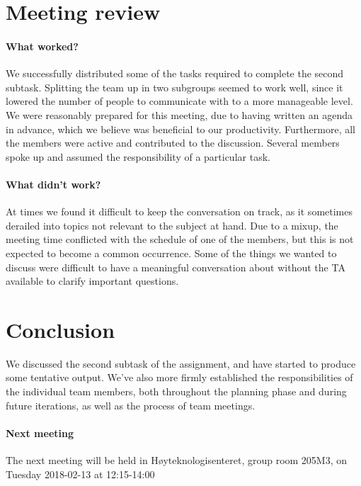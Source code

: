 \documentclass{article}
\begin{document}
\section{Meeting review}

\paragraph{What worked?}

We successfully distributed some of the tasks required to complete the second subtask. Splitting the team up in two subgroups seemed to work well, since it lowered the number of people to communicate with to a more manageable level. We were reasonably prepared for this meeting, due to having written an agenda in advance, which we believe was beneficial to our productivity. Furthermore, all the members were active and contributed to the discussion. Several members spoke up and assumed the responsibility of a particular task.

\paragraph{What didn't work?}

At times we found it difficult to keep the conversation on track, as it sometimes derailed into topics not relevant to the subject at hand. Due to a mixup, the meeting time conflicted with the schedule of one of the members, but this is not expected to become a common occurrence. Some of the things we wanted to discuss were difficult to have a meaningful conversation about without the TA available to clarify important questions.

\section{Conclusion}

We discussed the second subtask of the assignment, and have started to produce some tentative output. We've also more firmly established the responsibilities of the individual team members, both throughout the planning phase and during future iterations, as well as the process of team meetings.

\paragraph{Next meeting} The next meeting will be held in Høyteknologisenteret, group room 205M3, on Tuesday 2018-02-13 at 12:15-14:00
\end{document}
